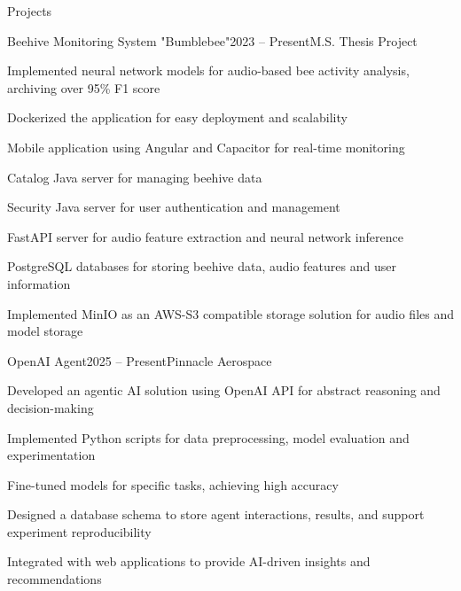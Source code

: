 \begin{rSection}{Projects}
    \begin{rSubsection}{Beehive Monitoring System "Bumblebee"}{2023 -- Present}{M.S. Thesis Project}{}
        \item Implemented neural network models for audio-based bee activity analysis, archiving over 95\% F1 score
        \item Dockerized the application for easy deployment and scalability
        \item Mobile application using Angular and Capacitor for real-time monitoring
        \item Catalog Java server for managing beehive data
        \item Security Java server for user authentication and management
        \item FastAPI server for audio feature extraction and neural network inference
        \item PostgreSQL databases for storing beehive data, audio features and user information
        \item Implemented MinIO as an AWS-S3 compatible storage solution for audio files and model storage
    \end{rSubsection}

    \begin{rSubsection}{OpenAI Agent}{2025 -- Present}{Pinnacle Aerospace}{}
        \item Developed an agentic AI solution using OpenAI API for abstract reasoning and decision-making
        \item Implemented Python scripts for data preprocessing, model evaluation and experimentation
        \item Fine-tuned models for specific tasks, achieving high accuracy
        \item Designed a database schema to store agent interactions, results, and support experiment reproducibility
        \item Integrated with web applications to provide AI-driven insights and recommendations
    \end{rSubsection}


\end{rSection}
